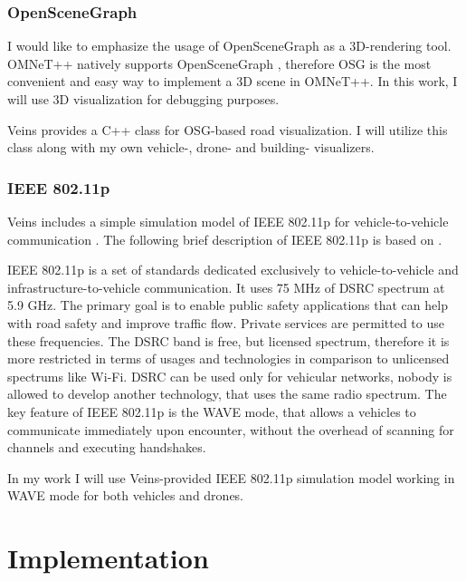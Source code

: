 \documentclass[]{nsm-thesis}
\begin{document}
\subsection{OpenSceneGraph}

I would like to emphasize the usage of OpenSceneGraph \cite{osg} as a 3D-rendering tool.  OMNeT++ natively supports OpenSceneGraph \cite{omnetpposg}, therefore \ac{OSG} is the most convenient and easy way to implement a 3D scene in OMNeT++. In this work, I will use 3D visualization for debugging purposes.

Veins provides a C++ class for \ac{OSG}-based road visualization. I will utilize this class along with my own vehicle-, drone- and building- visualizers.



\subsection{IEEE 802.11p}
Veins includes a simple simulation model of IEEE 802.11p for vehicle-to-vehicle communication \cite[Page~216]{Sommer2019}. The following brief description of IEEE 802.11p is based on \textcite{jiang2008ieee}.

IEEE 802.11p is a set of standards dedicated exclusively to vehicle-to-vehicle and infrastructure-to-vehicle communication. It uses 75 MHz of \ac{DSRC} spectrum at 5.9 GHz. The primary goal is to enable public safety applications that can help with road safety and improve traffic flow. Private services are permitted to use these frequencies. The \ac{DSRC} band is free, but licensed spectrum, therefore it is more restricted in terms of usages and technologies in comparison to unlicensed spectrums like Wi-Fi. \ac{DSRC} can be used only for vehicular networks, nobody is allowed to develop another technology, that uses the same radio spectrum. The key feature of IEEE 802.11p is the WAVE mode, that allows a vehicles to communicate immediately upon encounter, without the overhead of scanning for channels and executing handshakes. 

In my work I will use Veins-provided IEEE 802.11p simulation model working in WAVE mode for both vehicles and drones.



\chapter{Implementation}
\end{document}
